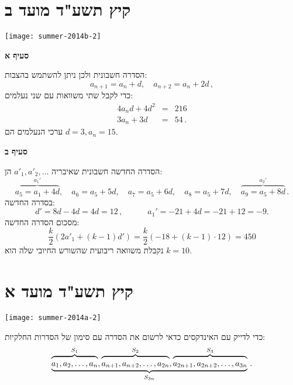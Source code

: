 \np

\section{קיץ תשע"ד מועד ב}

\begin{center}
\texttt{[image: summer-2014b-2]}
\end{center}
\vspace{-2ex}


\textbf{סעיף א}

הסדרה חשבונית ולכן ניתן להשתמש בהצבות:
\[
a_{n+1}=a_n+d, \quad a_{n+2}=a_n+2d\,,
\]
כדי לקבל שתי משוואות עם שני נעלמים:
\begin{eqnarray*}
4a_nd+4d^2 &=& 216\\
3a_n + 3d &=& 54\,.
\end{eqnarray*}
ערכי הנעלמים הם
$d=3,a_n=15$.

\textbf{סעיף ב}

הסדרה החדשה חשבונית שאיבריה 
$a'_1, a'_2,\ldots$
הן:
\[
\overbrace{a_5=a_1+4d}^{a_1'}, \quad a_6=a_5+5d,\quad  a_7=a_5+6d,\quad  a_8=a_5+7d,\quad  \overbrace{a_9=a_5+8d}^{a_2'}\,.
\]
בסדרה החדשה:
\[
d' = 8d-4d = 4d = 12\,,\quad\quad\quad a_1' = -21 + 4d= -21 + 12 = -9.
\]
מסכום הסדרה החדשה:
\[
\frac{k}{2}(2a'_1 + (k-1)d')=\frac{k}{2}(-18+(k-1)\cdot 12)=450
\]
נקבלת משוואה ריבועית שהשורש החיובי שלה הוא
$k=10$.



\np
\section{קיץ תשע"ד מועד א}

\begin{center}
\texttt{[image: summer-2014a-2]}
\end{center}

\vspace{-2ex}

כדי לדייק עם האינדקסים כדאי לרשום את הסדרה עם סימון של הסדרות החלקיות:
\[
\underbrace{
\overbrace{\rule{0pt}{8pt}a_1, a_2, \ldots, a_n}^{S_1},
\overbrace{\rule{0pt}{8pt}a_{n+1}, a_{n+2}, \ldots, a_{2n}}^{S_2},
\overbrace{\rule{0pt}{8pt}a_{2n+1}, a_{2n+2}, \ldots, a_{3n}}^{S_3}
}_{S_{3n}}\,.
\]

\vspace{-2ex}

